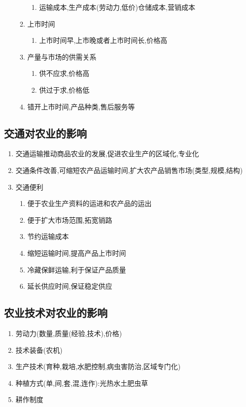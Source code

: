 \documentclass[a4paper]{article}
\begin{document}
\begin{enumerate}
\begin{enumerate}
\begin{enumerate}
                \item 运输成本,生产成本(劳动力,低价)仓储成本,营销成本
            \end{enumerate}
            \item 上市时间
            \begin{enumerate}
                \item 上市时间早,上市晚或者上市时间长,价格高
            \end{enumerate}
            \item 产量与市场的供需关系
            \begin{enumerate}
                \item 供不应求,价格高
                \item 供过于求,价格低
            \end{enumerate}
            \item 错开上市时间,产品种类,售后服务等
        \end{enumerate}
    \end{enumerate}
    \subsection{交通对农业的影响}
    \begin{enumerate}
        \item 交通运输推动商品农业的发展,促进农业生产的区域化,专业化
        \item 交通条件改善,可缩短农产品运输时间,扩大农产品销售市场(类型,规模,结构)
        \item 交通便利
        \begin{enumerate}
            \item 便于农业生产资料的运进和农产品的运出
            \item 便于扩大市场范围,拓宽销路
            \item 节约运输成本
            \item 缩短运输时间,提高产品上市时间
            \item 冷藏保鲜运输,利于保证产品质量
            \item 延长供应时间,保证稳定供应
        \end{enumerate}
    \end{enumerate}
    \subsection{农业技术对农业的影响}
    \begin{enumerate}
        \item 劳动力(数量,质量(经验,技术),价格)
        \item 技术装备(农机)
        \item 生产技术(育种,栽培,水肥控制,病虫害防治,区域专门化)
        \item 种植方式(单,间,套,混,连作):光热水土肥虫草
        \item 耕作制度
    \end{enumerate}
\end{document}
